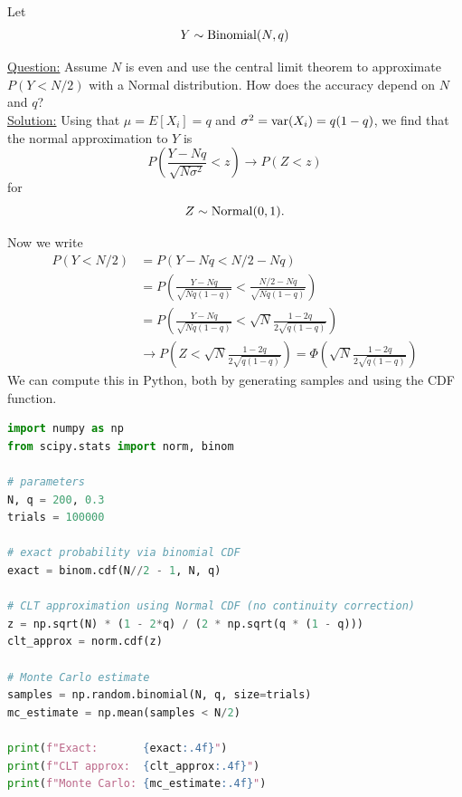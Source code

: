  
\begin{example}[Binomial] Let 
\begin{equation*}
Y \sim {\rm Binomial}(N,q)
\end{equation*}


 \noindent
\underline{Question:} Assume $N$ is even and use the central limit theorem to approximate $P(Y<N/2)$ with a Normal distribution. How does the accuracy depend on $N$ and $q$? \\

 \noindent
\underline{Solution:} Using that $\mu = E[X_i] = q$ and $\sigma^2 = {\rm var}(X_i) = q(1-q)$, we find that the normal approximation to $Y$ is 
\begin{equation*}
P\left( \frac{Y - Nq}{\sqrt{N \sigma^2}} <z\right) \to P(Z<z)
\end{equation*}
for 
\begin{equation*}
Z \sim {\rm Normal}(0,1). 
\end{equation*}

Now we write
\begin{align*}
P\left( Y<N/2\right) &= P\left(Y - Nq <N/2-Nq\right) \\
&= P\left(\frac{Y - Nq}{\sqrt{N q(1-q)}} <\frac{N/2-Nq}{\sqrt{N q(1-q)}}\right)\\
&= P\left(\frac{Y - Nq}{\sqrt{N q(1-q)}} < \sqrt{N} \frac{1-2q}{2\sqrt{q(1-q)}}\right)\\
&\to P\left(Z < \sqrt{N} \frac{1-2q}{2\sqrt{q(1-q)}}\right) = \Phi\left( \sqrt{N} \frac{1-2q}{2\sqrt{q(1-q)}}\right)
\end{align*}
We can compute this in Python, both by generating samples and using the CDF function.  

\begin{lstlisting}[language=Python]
import numpy as np
from scipy.stats import norm, binom

# parameters
N, q = 200, 0.3
trials = 100000

# exact probability via binomial CDF
exact = binom.cdf(N//2 - 1, N, q)

# CLT approximation using Normal CDF (no continuity correction)
z = np.sqrt(N) * (1 - 2*q) / (2 * np.sqrt(q * (1 - q)))
clt_approx = norm.cdf(z)

# Monte Carlo estimate
samples = np.random.binomial(N, q, size=trials)
mc_estimate = np.mean(samples < N/2)

print(f"Exact:       {exact:.4f}")
print(f"CLT approx:  {clt_approx:.4f}")
print(f"Monte Carlo: {mc_estimate:.4f}")
\end{lstlisting}


\end{example}



